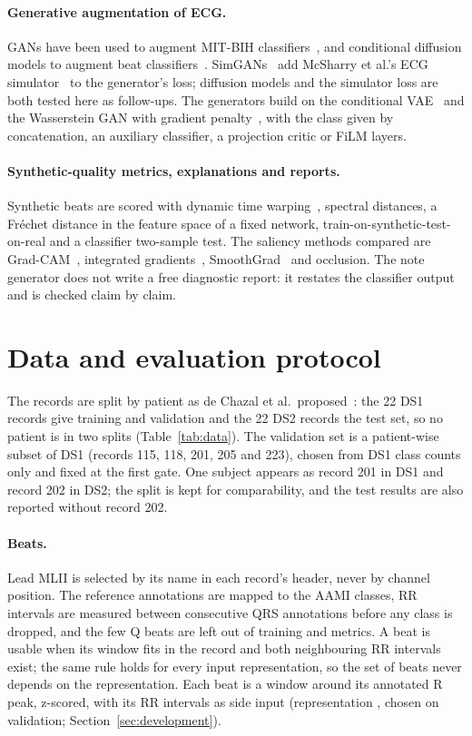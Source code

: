 \documentclass[11pt]{article}
\begin{document}
\paragraph{Generative augmentation of ECG.} GANs have been used to augment MIT-BIH classifiers~\cite{shaker2020gan}, and conditional
diffusion models to augment beat classifiers~\cite{kwak2024diffusion}. SimGANs~\cite{golany2020simgans} add McSharry et al.'s ECG
simulator~\cite{mcsharry2003dynamical} to the generator's loss; diffusion models and the simulator loss are both tested here as
follow-ups. The generators build on the conditional VAE~\cite{sohn2015cvae} and the Wasserstein GAN with gradient
penalty~\cite{gulrajani2017wgangp}, with the class given by concatenation, an auxiliary classifier, a projection critic or FiLM layers.

\paragraph{Synthetic-quality metrics, explanations and reports.} Synthetic beats are scored with dynamic time
warping~\cite{sakoe1978dtw}, spectral distances, a Fr\'echet distance in the feature space of a fixed network,
train-on-synthetic-test-on-real and a classifier two-sample test. The saliency methods compared are Grad-CAM~\cite{selvaraju2016gradcam},
integrated gradients~\cite{sundararajan2017ig}, SmoothGrad~\cite{smilkov2017smoothgrad} and occlusion. The note generator does not
write a free diagnostic report: it restates the classifier output and is checked claim by claim.

\section{Data and evaluation protocol}\label{sec:protocol}
The records are split by patient as de Chazal et al.\ proposed~\cite{dechazal2004}: the 22 DS1 records give training and validation
and the 22 DS2 records the test set, so no patient is in two splits (Table~\ref{tab:data}). The validation set is a patient-wise subset
of DS1 (records 115, 118, 201, 205 and 223), chosen from DS1 class counts only and fixed at the first gate. One subject appears as
record 201 in DS1 and record 202 in DS2; the split is kept for comparability, and the test results are also reported without record 202.

\paragraph{Beats.} Lead MLII is selected by its name in each record's header, never by channel position. The reference annotations are
mapped to the AAMI classes, RR intervals are measured between consecutive QRS annotations before any class is dropped, and the few Q beats
are left out of training and metrics. A beat is usable when its window fits in the record and both neighbouring RR intervals exist; the
same rule holds for every input representation, so the set of beats never depends on the representation. Each beat is a window around
its annotated R peak, z-scored, with its RR intervals as side input (representation \PhaseOneWinner, chosen on validation;
Section~\ref{sec:development}).
\end{document}
